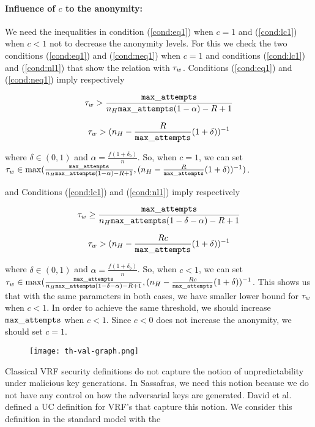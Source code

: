 \paragraph{Influence of $ c $ to the anonymity:} We need the inequalities in condition  (\ref{cond:eq1}) when $ c = 1 $ and (\ref{cond:lc1}) when $ c < 1 $ not to decrease the anonymity levels. For this we check the two conditions (\ref{cond:eq1})  and (\ref{cond:neq1}) when $ c = 1 $ and conditions (\ref{cond:lc1}) and (\ref{cond:nl1}) that show the relation with $ \tau_w $. Conditions (\ref{cond:eq1})  and (\ref{cond:neq1}) imply respectively 

$$\tau_w > \frac{\mathtt{max\_attempts}}{n_H \mathtt{max\_attempts} (1-\alpha)-R +1}$$


$$  \tau_w >({n_H -\frac{R}{\mathtt{max\_attempts}} (1+\delta)})^{-1}$$

where $ \delta \in (0,1) $ and $ \alpha = \frac{f(1+\delta_b)}{n} $. 
So, when $ c = 1 $, we can set  $ \tau_w \in \max( \frac{\mathtt{max\_attempts}}{n_H \mathtt{max\_attempts} (1-\alpha)-R +1}, ({n_H -\frac{R}{\mathtt{max\_attempts}} (1+\delta)})^{-1}) $.

and Conditions  (\ref{cond:lc1})  and (\ref{cond:nl1}) imply respectively 

$$\tau_w \geq \frac{\mathtt{max\_attempts}}{n_H  \mathtt{max\_attempts} (1-\delta-\alpha)-R +1}$$


$$  \tau_w > ({n_H -\frac{Rc}{\mathtt{max\_attempts}} (1+\delta)})^{-1}$$

where $ \delta \in (0,1) $ and $ \alpha = \frac{f(1+\delta_b)}{n} $. 
So, when $ c < 1 $, we can set  $ \tau_w \in \max(\frac{\mathtt{max\_attempts}}{n_H  \mathtt{max\_attempts} (1-\delta-\alpha)-R +1}, ({n_H -\frac{Rc}{\mathtt{max\_attempts}} (1+\delta)})^{-1}  $.
This shows us that with the same parameters in both cases, we have smaller lower bound for $ \tau_w $ when $c < 1 $. In order to achieve the same threshold, we should increase $ \mathtt{max\_attempts} $ when $ c < 1 $. Since $ c < 0$ does not increase the anonymity, we should set $ c = 1 $.


\begin{figure}\centering
	\texttt{[image: th-val-graph.png]}
\end{figure}
Classical VRF security definitions do not capture the notion of unpredictability under malicious key generations. In Sassafras, we need this notion because we do not have any control on how the adversarial keys are generated. David et al. \cite{praos} defined a UC definition for VRF's that capture this notion. We consider this definition in the standard model with the   


